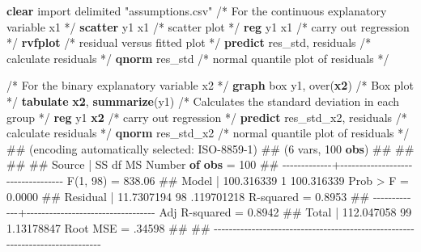 \documentclass[
  letterpaper,
  DIV=11,
  numbers=noendperiod]{scrreprt}
\newenvironment{Shaded}{\begin{snugshade}}{\end{snugshade}}
\newcommand{\BaseNTok}[1]{\textcolor[rgb]{0.68,0.00,0.00}{#1}}
\newcommand{\CommentTok}[1]{\textcolor[rgb]{0.37,0.37,0.37}{#1}}
\newcommand{\FunctionTok}[1]{\textcolor[rgb]{0.28,0.35,0.67}{#1}}
\newcommand{\KeywordTok}[1]{\textcolor[rgb]{0.00,0.23,0.31}{\textbf{#1}}}
\newcommand{\NormalTok}[1]{\textcolor[rgb]{0.00,0.23,0.31}{#1}}
\newcommand{\StringTok}[1]{\textcolor[rgb]{0.13,0.47,0.30}{#1}}
\begin{document}
\begin{Shaded}
\begin{Highlighting}[]
\KeywordTok{clear}
\NormalTok{import delimited }\StringTok{"assumptions.csv"}
\CommentTok{/* For the continuous explanatory variable x1 */}
\KeywordTok{scatter}\NormalTok{ y1 x1 }\CommentTok{/* scatter plot */}
\KeywordTok{reg}\NormalTok{ y1 x1 }\CommentTok{/* carry out regression */}
\KeywordTok{rvfplot} \CommentTok{/* residual versus fitted plot */}
\KeywordTok{predict}\NormalTok{ res\_std, residuals }\CommentTok{/* calculate residuals */}
\KeywordTok{qnorm}\NormalTok{ res\_std }\CommentTok{/* normal quantile plot of residuals */}
  
\CommentTok{/* For the binary explanatory variable x2 */}
\KeywordTok{graph}\NormalTok{ box y1, }\BaseNTok{over}\NormalTok{(}\KeywordTok{x2}\NormalTok{) }\CommentTok{/* Box plot */}
\KeywordTok{tabulate} \KeywordTok{x2}\NormalTok{, }\KeywordTok{summarize}\NormalTok{(y1) }\CommentTok{/* Calculates the standard deviation in each group */}
\KeywordTok{reg}\NormalTok{ y1 }\KeywordTok{x2} \CommentTok{/* carry out regression */}
\KeywordTok{predict}\NormalTok{ res\_std\_x2, residuals }\CommentTok{/* calculate residuals */}
\KeywordTok{qnorm}\NormalTok{ res\_std\_x2 }\CommentTok{/* normal quantile plot of residuals */}
\NormalTok{\#\# (encoding automatically selected: ISO{-}8859{-}1)}
\NormalTok{\#\# (6 vars, 100 }\KeywordTok{obs}\NormalTok{)}
\NormalTok{\#\# }
\NormalTok{\#\# }
\NormalTok{\#\# }
\NormalTok{\#\#       Source |       SS           df       MS      Number }\KeywordTok{of} \KeywordTok{obs}\NormalTok{   =       100}
\NormalTok{\#\# {-}{-}{-}{-}{-}{-}{-}{-}{-}{-}{-}{-}{-}+{-}{-}{-}{-}{-}{-}{-}{-}{-}{-}{-}{-}{-}{-}{-}{-}{-}{-}{-}{-}{-}{-}{-}{-}{-}{-}{-}{-}{-}{-}{-}{-}{-}{-}   }\FunctionTok{F}\NormalTok{(1, 98)        =    838.06}
\NormalTok{\#\#        Model |  100.316339         1  100.316339   Prob \textgreater{} }\FunctionTok{F}\NormalTok{        =    0.0000}
\NormalTok{\#\#     Residual |  11.7307194        98  .119701218   R{-}squared       =    0.8953}
\NormalTok{\#\# {-}{-}{-}{-}{-}{-}{-}{-}{-}{-}{-}{-}{-}+{-}{-}{-}{-}{-}{-}{-}{-}{-}{-}{-}{-}{-}{-}{-}{-}{-}{-}{-}{-}{-}{-}{-}{-}{-}{-}{-}{-}{-}{-}{-}{-}{-}{-}   Adj R{-}squared   =    0.8942}
\NormalTok{\#\#        Total |  112.047058        99  1.13178847   Root MSE        =    .34598}
\NormalTok{\#\# }
\NormalTok{\#\# {-}{-}{-}{-}{-}{-}{-}{-}{-}{-}{-}{-}{-}{-}{-}{-}{-}{-}{-}{-}{-}{-}{-}{-}{-}{-}{-}{-}{-}{-}{-}{-}{-}{-}{-}{-}{-}{-}{-}{-}{-}{-}{-}{-}{-}{-}{-}{-}{-}{-}{-}{-}{-}{-}{-}{-}{-}{-}{-}{-}{-}{-}{-}{-}{-}{-}{-}{-}{-}{-}{-}{-}{-}{-}{-}{-}{-}{-}}

\end{Highlighting}
\end{Shaded}
\end{document}
